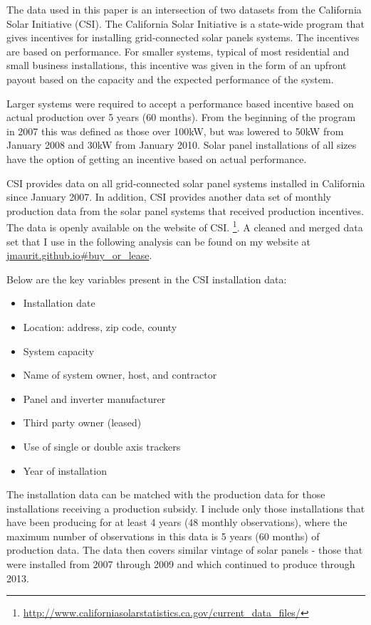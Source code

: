 \documentclass[12pt]{article}
\begin{document}
The data used in this paper is an intersection of two datasets from the California Solar Initiative (CSI). The California Solar Initiative is a state-wide program that gives incentives for installing grid-connected solar panels systems. The incentives are based on performance. For smaller systems, typical of most residential and small business installations, this incentive was given in the form of an upfront payout based on the capacity and the expected performance of the system.

Larger systems were required to accept a performance based incentive based on actual production over 5 years (60 months). From the beginning of the program in 2007 this was defined as those over 100kW, but was lowered to 50kW from January 2008 and 30kW from January 2010. Solar panel installations of all sizes have the option of getting an incentive based on actual performance.

CSI provides data on all grid-connected solar panel systems installed in California since January 2007. In addition, CSI provides another data set of monthly production data from the solar panel systems that received production incentives. The data is openly available on the website of CSI. \footnote{\url{http://www.californiasolarstatistics.ca.gov/current_data_files/}}. A cleaned and merged data set that I use in the following analysis can be found on my website at \url{jmaurit.github.io#buy_or_lease}.

Below are the key variables present in the CSI installation data:

\begin{itemize}
\item Installation date
\item Location: address, zip code, county
\item System capacity
\item Name of system owner, host, and contractor
\item Panel and inverter manufacturer
\item Third party owner (leased)
\item Use of single or double axis trackers
\item Year of installation
\end{itemize}

The installation data can be matched with the production data for those installations receiving a production subsidy. I include only those installations that have been producing for at least 4 years (48 monthly observations), where the maximum number of observations in this data is 5 years (60 months) of production data. The data then covers similar vintage of solar panels - those that were installed from 2007 through 2009 and which continued to produce through 2013.
\end{document}
